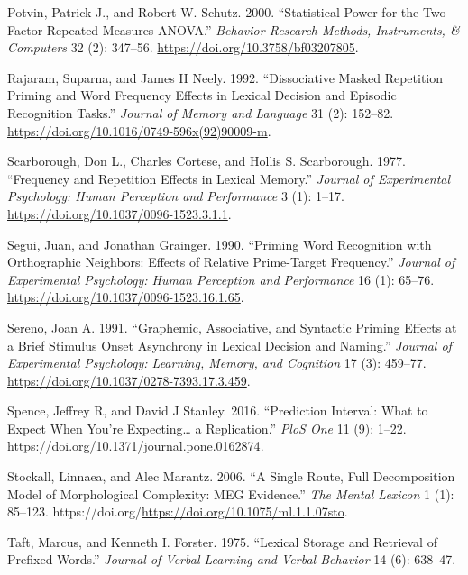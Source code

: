 \documentclass[
]{interact}
\newlength{\cslhangindent}
\newenvironment{CSLReferences}[2] %
 {\begin{list}{}{%
  \setlength{\itemindent}{0pt}
  \setlength{\leftmargin}{0pt}
  \setlength{\parsep}{0pt}
  \ifodd #1
   \setlength{\leftmargin}{\cslhangindent}
   \setlength{\itemindent}{-1\cslhangindent}
  \fi
  \setlength{\itemsep}{#2\baselineskip}}}
 {\end{list}}
\begin{document}
\begin{CSLReferences}{1}{0}
Potvin, Patrick J., and Robert W. Schutz. 2000. {``Statistical Power for
the Two-Factor Repeated Measures ANOVA.''} \emph{Behavior Research
Methods, Instruments, \& Computers} 32 (2): 347--56.
\url{https://doi.org/10.3758/bf03207805}.

Rajaram, Suparna, and James H Neely. 1992. {``Dissociative Masked
Repetition Priming and Word Frequency Effects in Lexical Decision and
Episodic Recognition Tasks.''} \emph{Journal of Memory and Language} 31
(2): 152--82. \url{https://doi.org/10.1016/0749-596x(92)90009-m}.

Scarborough, Don L., Charles Cortese, and Hollis S. Scarborough. 1977.
{``Frequency and Repetition Effects in Lexical Memory.''} \emph{Journal
of Experimental Psychology: Human Perception and Performance} 3 (1):
1--17. \url{https://doi.org/10.1037/0096-1523.3.1.1}.

Segui, Juan, and Jonathan Grainger. 1990. {``Priming Word Recognition
with Orthographic Neighbors: Effects of Relative Prime-Target
Frequency.''} \emph{Journal of Experimental Psychology: Human Perception
and Performance} 16 (1): 65--76.
\url{https://doi.org/10.1037/0096-1523.16.1.65}.

Sereno, Joan A. 1991. {``Graphemic, Associative, and Syntactic Priming
Effects at a Brief Stimulus Onset Asynchrony in Lexical Decision and
Naming.''} \emph{Journal of Experimental Psychology: Learning, Memory,
and Cognition} 17 (3): 459--77.
\url{https://doi.org/10.1037/0278-7393.17.3.459}.

Spence, Jeffrey R, and David J Stanley. 2016. {``Prediction Interval:
What to Expect When You're Expecting\ldots{} a Replication.''}
\emph{PloS One} 11 (9): 1--22.
\url{https://doi.org/10.1371/journal.pone.0162874}.

Stockall, Linnaea, and Alec Marantz. 2006. {``A Single Route, Full
Decomposition Model of Morphological Complexity: MEG Evidence.''}
\emph{The Mental Lexicon} 1 (1): 85--123.
https://doi.org/\url{https://doi.org/10.1075/ml.1.1.07sto}.

Taft, Marcus, and Kenneth I. Forster. 1975. {``Lexical Storage and
Retrieval of Prefixed Words.''} \emph{Journal of Verbal Learning and
Verbal Behavior} 14 (6): 638--47.


\end{CSLReferences}
\end{document}
